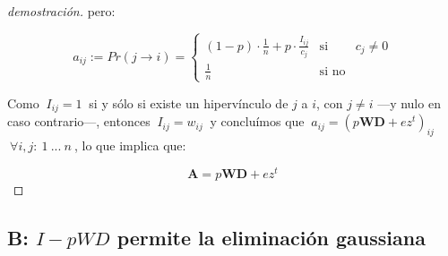 \begin{proof}[demostración]
\noindent pero: 
\vspace{1em}

\begin{equation*}
    a_{ij} := Pr(j \longrightarrow i) = \left\{ 
                                            \begin{array}{lcc}
                                            (1 - p)\cdot \frac{1}{n} + p \cdot \frac{I_{ij}}{c_j}      &  \text{si}    & c_j \neq 0\\
                                            \frac{1}{n}                                                &  \text{si no}  &
                                            \end{array}
                                        \right.
\end{equation*}
\vspace{1em}

Como $\ I_{ij} = 1\ $ si y sólo si existe un hipervínculo de $j$ a $i$, con $j \neq i$ ---y nulo en caso contrario---, entonces $\ I_{ij} = w_{ij}\ $ y concluímos que $\ a_{ij} = (p\textbf{W}\textbf{D} + ez^t)_{ij}$ $\ \forall i, j:\ 1\ ...\ n\ $,  lo que implica que:
\vspace{1em}

\begin{equation*}
    \textbf{A} = p\textbf{W}\textbf{D} + ez^t
\end{equation*}
\vspace{1em}

\end{proof}



\newpage
\subsection{B: $I - pWD$ permite la eliminación gaussiana}\label{A.2}

